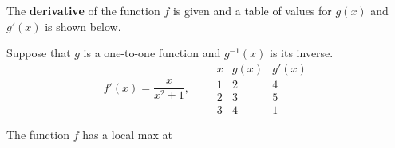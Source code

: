 \documentclass{ximera}
\author{Gregory Hartman \and Matthew Carr}
\begin{document}
\begin{exercise}



The \textbf{derivative} of the function $f$ is given and a table of values for $g(x)$ and $g'(x)$ is shown below.

Suppose that $g$ is a one-to-one function and $g^{-1}(x)$ is its inverse.
\[
f'(x)=\frac{x}{x^2+1},\qquad
\begin{array}{c|c|c}
x & g(x) & g'(x)\\ \hline
1 & 2 & 4\\ \hline
2 & 3 & 5\\ \hline
3 & 4 & 1
\end{array}
\]

The function $f$ has a local max at
\begin{prompt}
\begin{multipleChoice}
\end{multipleChoice}
\end{prompt}

\end{exercise}
\end{document}
